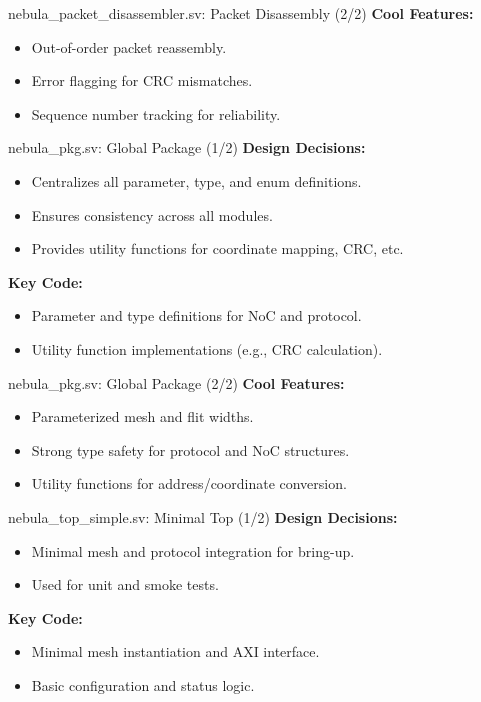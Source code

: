\documentclass{beamer}
\begin{document}
\begin{frame}{nebula\_packet\_disassembler.sv: Packet Disassembly (2/2)}
  \textbf{Cool Features:}
  \begin{itemize}
    \item Out-of-order packet reassembly.
    \item Error flagging for CRC mismatches.
    \item Sequence number tracking for reliability.
  \end{itemize}
\end{frame}

\begin{frame}{nebula\_pkg.sv: Global Package (1/2)}
  \textbf{Design Decisions:}
  \begin{itemize}
    \item Centralizes all parameter, type, and enum definitions.
    \item Ensures consistency across all modules.
    \item Provides utility functions for coordinate mapping, CRC, etc.
  \end{itemize}
  \textbf{Key Code:}
  \begin{itemize}
    \item Parameter and type definitions for NoC and protocol.
    \item Utility function implementations (e.g., CRC calculation).
  \end{itemize}
\end{frame}

\begin{frame}{nebula\_pkg.sv: Global Package (2/2)}
  \textbf{Cool Features:}
  \begin{itemize}
    \item Parameterized mesh and flit widths.
    \item Strong type safety for protocol and NoC structures.
    \item Utility functions for address/coordinate conversion.
  \end{itemize}
\end{frame}

\begin{frame}{nebula\_top\_simple.sv: Minimal Top (1/2)}
  \textbf{Design Decisions:}
  \begin{itemize}
    \item Minimal mesh and protocol integration for bring-up.
    \item Used for unit and smoke tests.
  \end{itemize}
  \textbf{Key Code:}
  \begin{itemize}
    \item Minimal mesh instantiation and AXI interface.
    \item Basic configuration and status logic.
  \end{itemize}
\end{frame}
\end{document}
